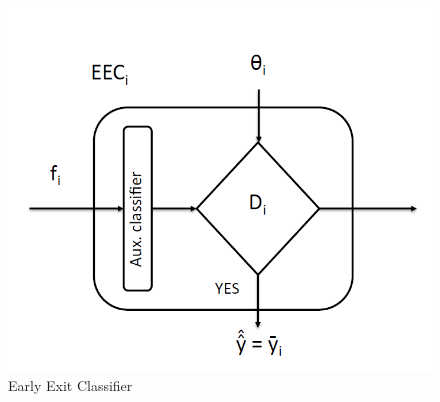 \documentclass{article}
\begin{document}
      \begin{figure}[H]
        \includegraphics[scale=0.35]{../Images/EEC.png}
        \centering
        \caption{Early Exit Classifier}
      \end{figure}
\end{document}
